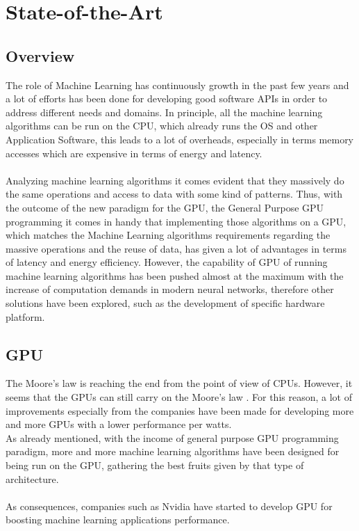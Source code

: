 \chapter{State-of-the-Art}
\section{Overview}
The role of Machine Learning has continuously growth in the past few years and a lot of efforts has been done for developing good software APIs in order to address different needs and domains. \newline In principle, all the machine learning algorithms can be run on the CPU, which already runs the OS and other Application Software, this leads to a lot of overheads, especially in terms memory accesses which are expensive in terms of energy and latency. \\\\
Analyzing machine learning algorithms it comes evident that they massively do the same operations and access to data with some kind of patterns. Thus, with the outcome of the new paradigm for the GPU, the General Purpose GPU programming it comes in handy that implementing those algorithms on a GPU, which matches the Machine Learning algorithms requirements regarding the massive operations and the reuse of data, has given a lot of advantages in terms of latency and energy efficiency. However, the capability of GPU of running machine learning algorithms has been pushed almost at the maximum with the increase of computation demands in modern neural networks, therefore other solutions have been explored, such as the development of specific hardware platform.

\section{GPU}
The Moore's law is reaching the end from the point of view of CPUs. However, it seems that the GPUs can still carry on the Moore's law \cite{5496638}.\newline
For this reason, a lot of improvements especially from the companies have been made for developing more and more GPUs with a lower performance per watts.\\
As already mentioned, with the income of general purpose GPU programming paradigm, more and more machine learning algorithms have been designed for being run on the GPU, gathering the best fruits given by that type of architecture.\\\\
As consequences, companies such as Nvidia have started to develop GPU for boosting machine learning applications performance.
